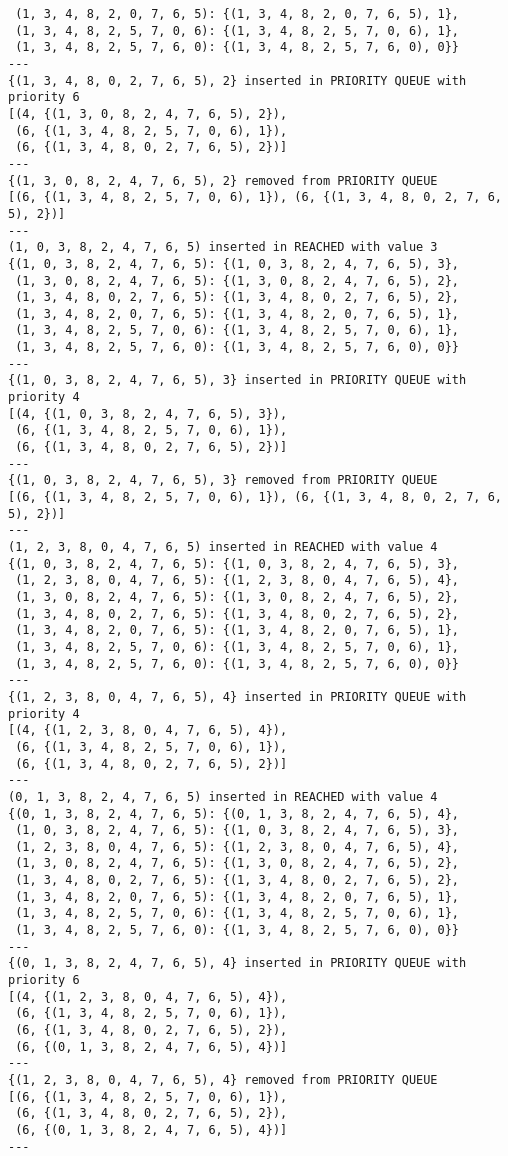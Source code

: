 \documentclass{article}
\begin{document}
\begin{verbatim}
 (1, 3, 4, 8, 2, 0, 7, 6, 5): {(1, 3, 4, 8, 2, 0, 7, 6, 5), 1},
 (1, 3, 4, 8, 2, 5, 7, 0, 6): {(1, 3, 4, 8, 2, 5, 7, 0, 6), 1},
 (1, 3, 4, 8, 2, 5, 7, 6, 0): {(1, 3, 4, 8, 2, 5, 7, 6, 0), 0}}
---
{(1, 3, 4, 8, 0, 2, 7, 6, 5), 2} inserted in PRIORITY QUEUE with priority 6
[(4, {(1, 3, 0, 8, 2, 4, 7, 6, 5), 2}),
 (6, {(1, 3, 4, 8, 2, 5, 7, 0, 6), 1}),
 (6, {(1, 3, 4, 8, 0, 2, 7, 6, 5), 2})]
---
{(1, 3, 0, 8, 2, 4, 7, 6, 5), 2} removed from PRIORITY QUEUE
[(6, {(1, 3, 4, 8, 2, 5, 7, 0, 6), 1}), (6, {(1, 3, 4, 8, 0, 2, 7, 6, 5), 2})]
---
(1, 0, 3, 8, 2, 4, 7, 6, 5) inserted in REACHED with value 3
{(1, 0, 3, 8, 2, 4, 7, 6, 5): {(1, 0, 3, 8, 2, 4, 7, 6, 5), 3},
 (1, 3, 0, 8, 2, 4, 7, 6, 5): {(1, 3, 0, 8, 2, 4, 7, 6, 5), 2},
 (1, 3, 4, 8, 0, 2, 7, 6, 5): {(1, 3, 4, 8, 0, 2, 7, 6, 5), 2},
 (1, 3, 4, 8, 2, 0, 7, 6, 5): {(1, 3, 4, 8, 2, 0, 7, 6, 5), 1},
 (1, 3, 4, 8, 2, 5, 7, 0, 6): {(1, 3, 4, 8, 2, 5, 7, 0, 6), 1},
 (1, 3, 4, 8, 2, 5, 7, 6, 0): {(1, 3, 4, 8, 2, 5, 7, 6, 0), 0}}
---
{(1, 0, 3, 8, 2, 4, 7, 6, 5), 3} inserted in PRIORITY QUEUE with priority 4
[(4, {(1, 0, 3, 8, 2, 4, 7, 6, 5), 3}),
 (6, {(1, 3, 4, 8, 2, 5, 7, 0, 6), 1}),
 (6, {(1, 3, 4, 8, 0, 2, 7, 6, 5), 2})]
---
{(1, 0, 3, 8, 2, 4, 7, 6, 5), 3} removed from PRIORITY QUEUE
[(6, {(1, 3, 4, 8, 2, 5, 7, 0, 6), 1}), (6, {(1, 3, 4, 8, 0, 2, 7, 6, 5), 2})]
---
(1, 2, 3, 8, 0, 4, 7, 6, 5) inserted in REACHED with value 4
{(1, 0, 3, 8, 2, 4, 7, 6, 5): {(1, 0, 3, 8, 2, 4, 7, 6, 5), 3},
 (1, 2, 3, 8, 0, 4, 7, 6, 5): {(1, 2, 3, 8, 0, 4, 7, 6, 5), 4},
 (1, 3, 0, 8, 2, 4, 7, 6, 5): {(1, 3, 0, 8, 2, 4, 7, 6, 5), 2},
 (1, 3, 4, 8, 0, 2, 7, 6, 5): {(1, 3, 4, 8, 0, 2, 7, 6, 5), 2},
 (1, 3, 4, 8, 2, 0, 7, 6, 5): {(1, 3, 4, 8, 2, 0, 7, 6, 5), 1},
 (1, 3, 4, 8, 2, 5, 7, 0, 6): {(1, 3, 4, 8, 2, 5, 7, 0, 6), 1},
 (1, 3, 4, 8, 2, 5, 7, 6, 0): {(1, 3, 4, 8, 2, 5, 7, 6, 0), 0}}
---
{(1, 2, 3, 8, 0, 4, 7, 6, 5), 4} inserted in PRIORITY QUEUE with priority 4
[(4, {(1, 2, 3, 8, 0, 4, 7, 6, 5), 4}),
 (6, {(1, 3, 4, 8, 2, 5, 7, 0, 6), 1}),
 (6, {(1, 3, 4, 8, 0, 2, 7, 6, 5), 2})]
---
(0, 1, 3, 8, 2, 4, 7, 6, 5) inserted in REACHED with value 4
{(0, 1, 3, 8, 2, 4, 7, 6, 5): {(0, 1, 3, 8, 2, 4, 7, 6, 5), 4},
 (1, 0, 3, 8, 2, 4, 7, 6, 5): {(1, 0, 3, 8, 2, 4, 7, 6, 5), 3},
 (1, 2, 3, 8, 0, 4, 7, 6, 5): {(1, 2, 3, 8, 0, 4, 7, 6, 5), 4},
 (1, 3, 0, 8, 2, 4, 7, 6, 5): {(1, 3, 0, 8, 2, 4, 7, 6, 5), 2},
 (1, 3, 4, 8, 0, 2, 7, 6, 5): {(1, 3, 4, 8, 0, 2, 7, 6, 5), 2},
 (1, 3, 4, 8, 2, 0, 7, 6, 5): {(1, 3, 4, 8, 2, 0, 7, 6, 5), 1},
 (1, 3, 4, 8, 2, 5, 7, 0, 6): {(1, 3, 4, 8, 2, 5, 7, 0, 6), 1},
 (1, 3, 4, 8, 2, 5, 7, 6, 0): {(1, 3, 4, 8, 2, 5, 7, 6, 0), 0}}
---
{(0, 1, 3, 8, 2, 4, 7, 6, 5), 4} inserted in PRIORITY QUEUE with priority 6
[(4, {(1, 2, 3, 8, 0, 4, 7, 6, 5), 4}),
 (6, {(1, 3, 4, 8, 2, 5, 7, 0, 6), 1}),
 (6, {(1, 3, 4, 8, 0, 2, 7, 6, 5), 2}),
 (6, {(0, 1, 3, 8, 2, 4, 7, 6, 5), 4})]
---
{(1, 2, 3, 8, 0, 4, 7, 6, 5), 4} removed from PRIORITY QUEUE
[(6, {(1, 3, 4, 8, 2, 5, 7, 0, 6), 1}),
 (6, {(1, 3, 4, 8, 0, 2, 7, 6, 5), 2}),
 (6, {(0, 1, 3, 8, 2, 4, 7, 6, 5), 4})]
---
\end{verbatim}
\end{document}

